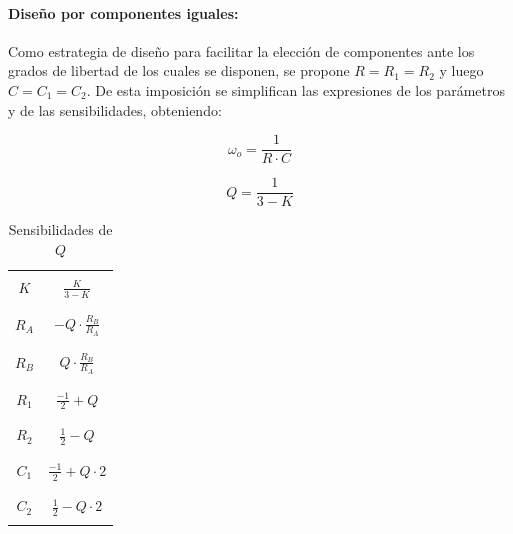 \paragraph{Dise\~no por componentes iguales:} Como estrategia de dise\~no para facilitar la elecci\'on de componentes ante los grados de libertad de los cuales se disponen,
se propone $R = R_1 = R_2$ y luego $C = C_1 = C_2$. De esta imposici\'on se simplifican las expresiones de los par\'ametros y de las sensibilidades, obteniendo:

\begin{equation}
    \omega_o = \frac{1}{R \cdot C}
    \label{eq:wo_ajuste_componentes_iguales}
\end{equation}

\begin{equation}
    Q = \frac{1}{3 - K}
    \label{eq:q_ajuste_componentes_iguales}
\end{equation}

\begin{table}[H]
    \centering
    \begin{tabular}{c | c}
        \hline \\
        $K$ & $\frac{K}{3 - K}$ \\
        \\ \hline \\
        $R_A$ & $-Q \cdot \frac{R_B}{R_A}$ \\
        \\ \hline \\
        $R_B$ & $Q \cdot \frac{R_B}{R_A}$ \\
        \\ \hline \\
        $R_1$ & $\frac{-1}{2} + Q$ \\
        \\ \hline \\
        $R_2$ & $\frac{1}{2} - Q$ \\
        \\ \hline \\
        $C_1$ & $\frac{-1}{2} + Q \cdot 2$ \\
        \\ \hline \\
        $C_2$ & $\frac{1}{2} - Q \cdot 2$ \\
        \\ \hline
    \end{tabular}
    \caption{Sensibilidades de $Q$}
\end{table}

